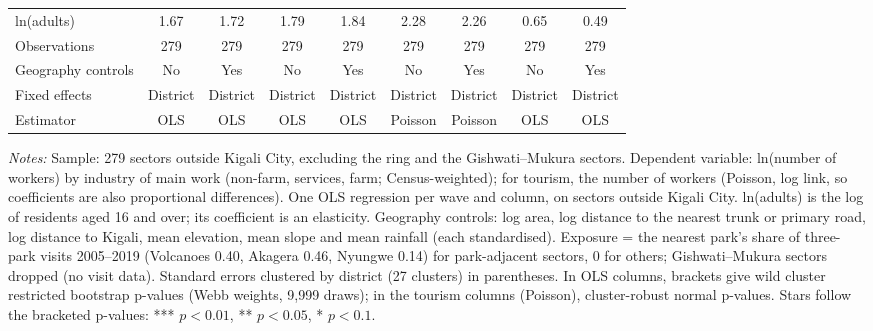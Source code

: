 \documentclass[11pt]{article}
\begin{document}
\begin{table}[H]
{\begin{tabular}{lcccccccc}
ln(adults) & 1.67 & 1.72 & 1.79 & 1.84 & 2.28 & 2.26 & 0.65 & 0.49 \\
Observations & 279 & 279 & 279 & 279 & 279 & 279 & 279 & 279 \\
\midrule
Geography controls & No & Yes & No & Yes & No & Yes & No & Yes \\
Fixed effects & District & District & District & District & District & District & District & District \\
Estimator & OLS & OLS & OLS & OLS & Poisson & Poisson & OLS & OLS \\
\bottomrule
\end{tabular}}
\begin{minipage}{0.97\textwidth}\scriptsize
\textit{Notes:} Sample: 279 sectors outside Kigali City, excluding the ring and the Gishwati--Mukura sectors. Dependent variable: ln(number of workers) by industry of main work (non-farm, services, farm; Census-weighted); for tourism, the number of workers (Poisson, log link, so coefficients are also proportional differences). One OLS regression per wave and column, on sectors outside Kigali City. ln(adults) is the log of residents aged 16 and over; its coefficient is an elasticity. Geography controls: log area, log distance to the nearest trunk or primary road, log distance to Kigali, mean elevation, mean slope and mean rainfall (each standardised). Exposure = the nearest park's share of three-park visits 2005--2019 (Volcanoes 0.40, Akagera 0.46, Nyungwe 0.14) for park-adjacent sectors, 0 for others; Gishwati--Mukura sectors dropped (no visit data). Standard errors clustered by district (27 clusters) in parentheses. In OLS columns, brackets give wild cluster restricted bootstrap p-values (Webb weights, 9,999 draws); in the tourism columns (Poisson), cluster-robust normal p-values. Stars follow the bracketed p-values: *** $p<0.01$, ** $p<0.05$, * $p<0.1$.
\end{minipage}
\end{table}
\end{document}
